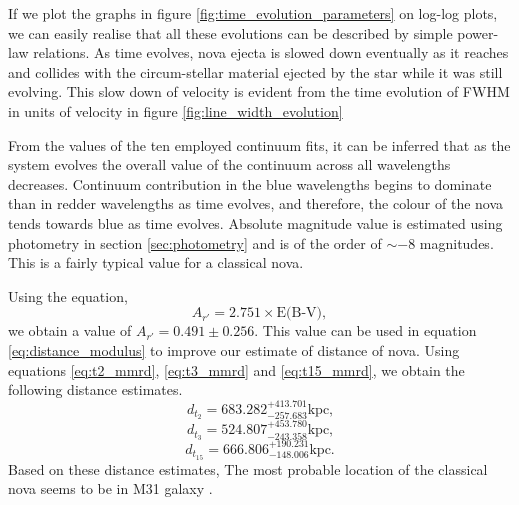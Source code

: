\documentclass{tda}
\begin{document}
	If we plot the graphs in figure \ref{fig:time_evolution_parameters} on log-log plots, we can easily realise that all these evolutions can be described by simple power-law relations. As time evolves, nova ejecta is slowed down eventually as it reaches and collides with the circum-stellar material ejected by the star while it was still evolving. This slow down of velocity is evident from the time evolution of FWHM in units of velocity in figure \ref{fig:line_width_evolution}

	From the values of the ten employed continuum fits, it can be inferred that as the system evolves the overall value of the continuum across all wavelengths decreases. Continuum contribution in the blue wavelengths begins to dominate than in redder wavelengths as time evolves, and therefore, the colour of the nova tends towards blue as time evolves. Absolute magnitude value is estimated using photometry in section \ref{sec:photometry} and is of the order of \(\sim -8\) magnitudes. This is a fairly typical value for a classical nova.

	Using the equation,
	\[A_{r'} = 2.751 \times \textrm{E(B-V)}, \]
	we obtain a value of \(A_{r'} = 0.491 \pm 0.256\). This value can be used in equation \ref{eq:distance_modulus} to improve our estimate of distance of nova. Using equations \ref{eq:t2_mmrd}, \ref{eq:t3_mmrd} and \ref{eq:t15_mmrd}, we obtain the following distance estimates.
	\[d_{t_2} = 683.282^{+413.701}_{-257.683} \textrm{kpc,}\]
	\[d_{t_3} = 524.807^{+453.780}_{-243.358} \textrm{kpc,}\]
	\[d_{t_{15}} = 666.806^{+190.231}_{-148.006} \textrm{kpc.}\]
	Based on these distance estimates, The most probable location of the classical nova seems to be in M31 galaxy \citep{2012ApJ...745..156R}.
\end{document}
